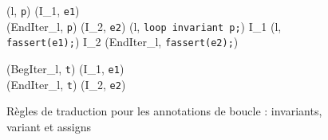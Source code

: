 \begin{figure*}[h!]
  \scriptsize{
    {
      {}
      {
      }{}
    }

    {
      {(l, \mbox{\lstinline'p'})  (I_1, \mbox{\lstinline'e1'}) \\
        (EndIter_l, \mbox{\lstinline'p'}) 
        (I_2, \mbox{\lstinline'e2'})}
      {
        (l, \mbox{\lstinline'loop invariant p;'}) 
        I_1 \concat (l, \mbox{\lstinline'fassert(e1);'})
        \concat I_2 \concat (EndIter_l, \mbox{\lstinline'fassert(e2);'})
      }{}
    }

    {
      {
        (BegIter_l, \mbox{\lstinline't'}) 
        (I_1, \mbox{\lstinline'e1'}) \\
        (EndIter_l, \mbox{\lstinline't'}) 
        (I_2, \mbox{\lstinline'e2'})
      }
      {
      }{}
    }
  }
  \caption{Règles de traduction pour les annotations de boucle : invariants,
    variant et assigns}
  \label{fig:loop-annot}
\end{figure*}
